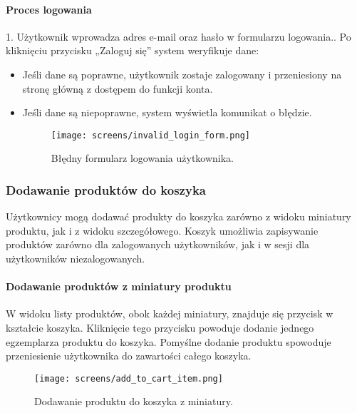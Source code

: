 \documentclass[12pt,a4paper,oneside]{article}
\theoremstyle{definition}
\numberwithin{equation}{section}
\begin{document}
\paragraph{Proces logowania}
1. Użytkownik wprowadza adres e-mail oraz hasło w formularzu logowania.. Po kliknięciu przycisku „Zaloguj się” system weryfikuje dane:
   \begin{itemize}
       \item Jeśli dane są poprawne, użytkownik zostaje zalogowany i przeniesiony na stronę główną z dostępem do funkcji konta.
       \item Jeśli dane są niepoprawne, system wyświetla komunikat o błędzie.
       \begin{figure}[h!]
        \centering
        \texttt{[image: screens/invalid\_login\_form.png]}
        \caption{Błędny formularz logowania użytkownika.}
        \label{fig:invalid_login_form}
    \end{figure}
   \end{itemize}






\newpage
   \subsubsection{Dodawanie produktów do koszyka}
   Użytkownicy mogą dodawać produkty do koszyka zarówno z widoku miniatury produktu, jak i z widoku szczegółowego. Koszyk umożliwia zapisywanie produktów zarówno dla zalogowanych użytkowników, jak i w sesji dla użytkowników niezalogowanych.
   
   \paragraph{Dodawanie produktów z miniatury produktu}
   W widoku listy produktów, obok każdej miniatury, znajduje się przycisk w kształcie koszyka. Kliknięcie tego przycisku powoduje dodanie jednego egzemplarza produktu do koszyka. Pomyślne dodanie produktu spowoduje przeniesienie użytkownika do zawartości całego koszyka.
      
   \begin{figure}[h!]
    \centering
    \texttt{[image: screens/add\_to\_cart\_item.png]}
    \caption{Dodawanie produktu do koszyka z miniatury.}
    \label{fig:add_to_cart_miniature}
\end{figure}
\end{document}
